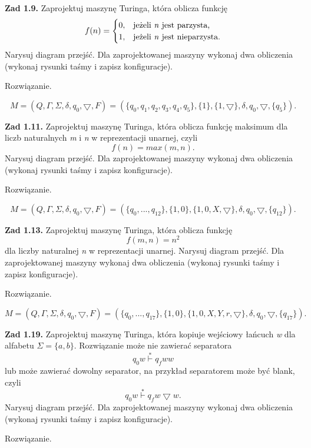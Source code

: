 \documentclass[12pt]{article}
\begin{document}
\noindent\textbf{Zad 1.9.} Zaprojektuj maszynę Turinga, która oblicza funkcję
\[f(n)=
	\begin{cases}
	0, & \text{jeżeli \textit{n} jest parzysta,} \\
	1, & \text{jeżeli \textit{n} jest nieparzysta.}
	\end{cases}
\]
Narysuj diagram przejść. Dla zaprojektowanej maszyny wykonaj dwa obliczenia (wykonaj rysunki taśmy i zapisz konfiguracje).

 Rozwiązanie.

\[M=(Q,\Gamma,\Sigma,\delta,q_0,\bigtriangledown,F)=(\{q_0,q_1,q_2,q_3,q_4,q_5\},\{1\},\{1,\bigtriangledown\},\delta,q_0,\bigtriangledown,\{q_5\}).\]

\newpage

\noindent\textbf{Zad 1.11.} Zaprojektuj maszynę Turinga, która oblicza funkcję maksimum dla liczb naturalnych \textit{m} i \textit{n} w reprezentacji unarnej, czyli
\[f(n)=max(m,n).\]
Narysuj diagram przejść. Dla zaprojektowanej maszyny wykonaj dwa obliczenia (wykonaj rysunki taśmy i zapisz konfiguracje).

 Rozwiązanie.
 
\[M=(Q,\Gamma,\Sigma,\delta,q_0,\bigtriangledown,F)=(\{q_0,...,q_{12}\},\{1,0\},\{1,0,X,\bigtriangledown\},\delta,q_0,\bigtriangledown,\{q_{12}\}).\]

\newpage

\noindent\textbf{Zad 1.13.} Zaprojektuj maszynę Turinga, która oblicza funkcję
\[f(m,n)=n^2\]
dla liczby naturalnej \textit{n} w reprezentacji unarnej. Narysuj diagram przejść. Dla zaprojektowanej maszyny wykonaj dwa obliczenia (wykonaj rysunki taśmy i zapisz konfiguracje).

 Rozwiązanie.
 
\[M=(Q,\Gamma,\Sigma,\delta,q_0,\bigtriangledown,F)=(\{q_0,...,q_{17}\},\{1,0\},\{1,0,X,Y,r,\bigtriangledown\},\delta,q_0,\bigtriangledown,\{q_{17}\}).\]

\newpage

\noindent\textbf{Zad 1.19.} Zaprojektuj maszynę Turinga, która kopiuje wejściowy łańcuch \textit{w} dla alfabetu $\Sigma=\{a,b\}$. Rozwiązanie może nie zawierać separatora
\[q_0w \overset{*}{\vdash} q_fww\]
lub  może  zawierać  dowolny  separator,  na  przykład  separatorem  może  być blank, czyli
\[q_0w \overset{*}{\vdash} q_fw \bigtriangledown w.\]
Narysuj diagram przejść. Dla zaprojektowanej maszyny wykonaj dwa obliczenia (wykonaj rysunki taśmy i zapisz konfiguracje).

 Rozwiązanie.
 
\end{document}
